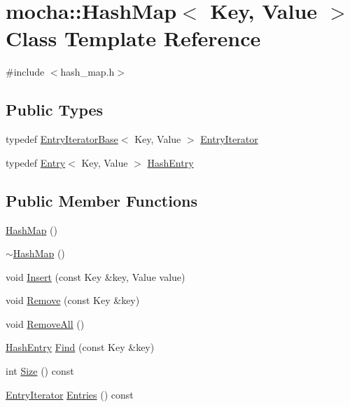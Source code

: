 \hypertarget{classmocha_1_1_hash_map}{
\section{mocha::HashMap$<$ Key, Value $>$ Class Template Reference}
\label{classmocha_1_1_hash_map}
}


{\ttfamily \#include $<$hash\_\-map.h$>$}

\subsection*{Public Types}
\begin{DoxyCompactItemize}
\item 
typedef \hyperlink{classmocha_1_1_entry_iterator_base}{EntryIteratorBase}$<$ Key, Value $>$ \hyperlink{classmocha_1_1_hash_map_adb61a0b1c576b5a3820642e28c7c03ba}{EntryIterator}
\item 
typedef \hyperlink{classmocha_1_1_entry}{Entry}$<$ Key, Value $>$ \hyperlink{classmocha_1_1_hash_map_ae59c02064cc9b37392d9653d20273185}{HashEntry}
\end{DoxyCompactItemize}
\subsection*{Public Member Functions}
\begin{DoxyCompactItemize}
\item 
\hyperlink{classmocha_1_1_hash_map_a0497c58824f987291138c1b3eaefaba1}{HashMap} ()
\item 
\hyperlink{classmocha_1_1_hash_map_a533148e07c5e4b0dd3a0e62157d91782}{$\sim$HashMap} ()
\item 
void \hyperlink{classmocha_1_1_hash_map_a27a74bad56e6c4c1af16314675d8dd73}{Insert} (const Key \&key, Value value)
\item 
void \hyperlink{classmocha_1_1_hash_map_aa0a2ca97473973e3a5713c0e6bd32901}{Remove} (const Key \&key)
\item 
void \hyperlink{classmocha_1_1_hash_map_a7bf1a509ca90639e19383fca9e66548d}{RemoveAll} ()
\item 
\hyperlink{classmocha_1_1_entry}{HashEntry} \hyperlink{classmocha_1_1_hash_map_a75d6087645922b43077a05c97e2f4891}{Find} (const Key \&key)
\item 
int \hyperlink{classmocha_1_1_hash_map_a2ee4018f93e3d5029ed4aba536838682}{Size} () const 
\item 
\hyperlink{classmocha_1_1_entry_iterator_base}{EntryIterator} \hyperlink{classmocha_1_1_hash_map_ab7ed35e8ad9833aa29c456aab543f4bf}{Entries} () const 
\end{DoxyCompactItemize}
